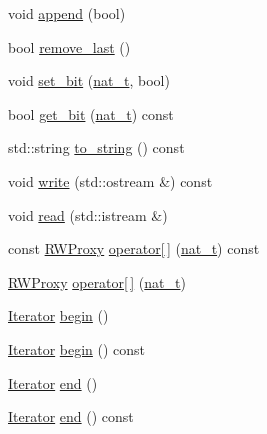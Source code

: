 \begin{DoxyCompactItemize}
\item 
void \hyperlink{class_designar_1_1_dyn_bit_set_a061298007ec0f5743f1f7f7f7e87988c}{append} (bool)
\item 
bool \hyperlink{class_designar_1_1_dyn_bit_set_a0ecc1cd2ec0e273ecaab4c81e769e589}{remove\+\_\+last} ()
\item 
void \hyperlink{class_designar_1_1_dyn_bit_set_a3f9dc7630c5c25c85dffc260f3feccb3}{set\+\_\+bit} (\hyperlink{namespace_designar_aa72662848b9f4815e7bf31a7cf3e33d1}{nat\+\_\+t}, bool)
\item 
bool \hyperlink{class_designar_1_1_dyn_bit_set_ac680bec714f7d06a511bc41c3a514d3c}{get\+\_\+bit} (\hyperlink{namespace_designar_aa72662848b9f4815e7bf31a7cf3e33d1}{nat\+\_\+t}) const
\item 
std\+::string \hyperlink{class_designar_1_1_dyn_bit_set_ad393d0c9a7f15f022b0529fbe2983780}{to\+\_\+string} () const
\item 
void \hyperlink{class_designar_1_1_dyn_bit_set_ac04df606a53e544d8e87d931be0abac0}{write} (std\+::ostream \&) const
\item 
void \hyperlink{class_designar_1_1_dyn_bit_set_a18b74c7e27d2af9fefd48b1eabfd377d}{read} (std\+::istream \&)
\item 
const \hyperlink{class_designar_1_1_dyn_bit_set_1_1_r_w_proxy}{R\+W\+Proxy} \hyperlink{class_designar_1_1_dyn_bit_set_a0fa3213cdd6a6a3470c03a961a34e909}{operator\mbox{[}$\,$\mbox{]}} (\hyperlink{namespace_designar_aa72662848b9f4815e7bf31a7cf3e33d1}{nat\+\_\+t}) const
\item 
\hyperlink{class_designar_1_1_dyn_bit_set_1_1_r_w_proxy}{R\+W\+Proxy} \hyperlink{class_designar_1_1_dyn_bit_set_afe3a09791ecbffbe9c13b4b7a214fe66}{operator\mbox{[}$\,$\mbox{]}} (\hyperlink{namespace_designar_aa72662848b9f4815e7bf31a7cf3e33d1}{nat\+\_\+t})
\item 
\hyperlink{class_designar_1_1_dyn_bit_set_1_1_iterator}{Iterator} \hyperlink{class_designar_1_1_dyn_bit_set_a40cde0bc849513bbad925b4733d777f6}{begin} ()
\item 
\hyperlink{class_designar_1_1_dyn_bit_set_1_1_iterator}{Iterator} \hyperlink{class_designar_1_1_dyn_bit_set_a73c8564a300f36934b2de273c1f8eb18}{begin} () const
\item 
\hyperlink{class_designar_1_1_dyn_bit_set_1_1_iterator}{Iterator} \hyperlink{class_designar_1_1_dyn_bit_set_a2d7725ebf960363167ccabaacd37bec6}{end} ()
\item 
\hyperlink{class_designar_1_1_dyn_bit_set_1_1_iterator}{Iterator} \hyperlink{class_designar_1_1_dyn_bit_set_a1ca3f63ddb290be233b1311d1b4439b2}{end} () const
\end{DoxyCompactItemize}


